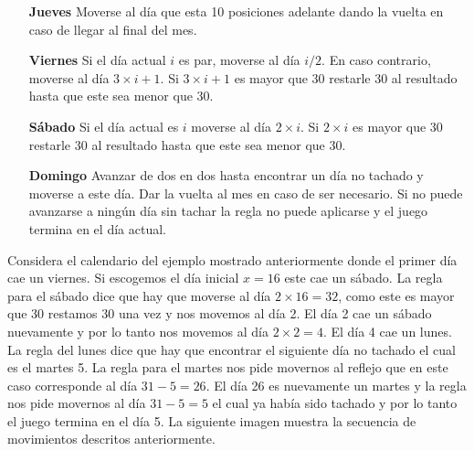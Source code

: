 \documentclass{oci}
\begin{document}
\begin{problemDescription}
\begin{itemize}
    \item[\bf Jueves] Moverse al día que esta 10 posiciones adelante dando la vuelta en caso de
    llegar al final del mes.

    \item[\bf Viernes] Si el día actual $i$ es par, moverse al día $i/2$.
    En caso contrario, moverse al día $3\times i + 1$.
    Si $3\times i + 1$ es mayor que 30 restarle 30 al resultado hasta que este sea menor que 30.

    \item[\bf Sábado] Si el día actual es $i$ moverse al día $2\times i$.
    Si $2\times i$ es mayor que 30 restarle 30 al resultado hasta que este sea menor que 30.

    \item[\bf Domingo] Avanzar de dos en dos hasta encontrar un día no tachado y moverse a este día.
    Dar la vuelta al mes en caso de ser necesario.
    Si no puede avanzarse a ningún día sin tachar la regla no puede aplicarse y el juego termina en el día actual.
  \end{itemize}

  Considera el calendario del ejemplo mostrado anteriormente donde el primer día cae un viernes.
  Si escogemos el día inicial $x=16$ este cae un sábado.
  La regla para el sábado dice que hay que moverse al día $2\times 16 = 32$, como este es mayor que 30
  restamos 30 una vez y nos movemos al día 2.
  El día 2 cae un sábado nuevamente y por lo tanto nos movemos al día $2\times 2=4$.
  El día 4 cae un lunes.
  La regla del lunes dice que hay que encontrar el siguiente día no tachado el cual es el martes 5.
  La regla para el martes nos pide movernos al reflejo que en este caso corresponde al día $31 - 5 = 26$.
  El día 26 es nuevamente un martes y la regla nos pide movernos al día $31 - 5 = 5$ el cual ya había
  sido tachado y por lo tanto el juego termina en el día 5.
  La siguiente imagen muestra la secuencia de movimientos descritos anteriormente.


\end{problemDescription}
\end{document}
